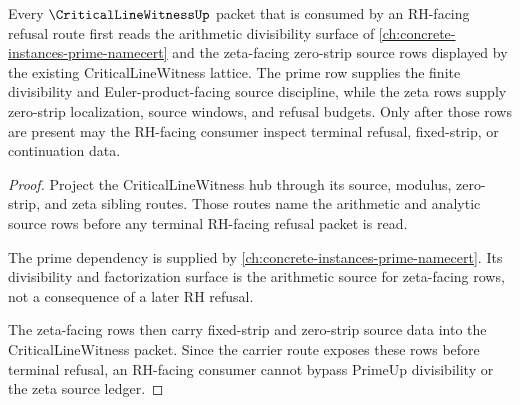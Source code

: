 \begin{proposition}
\label{prop:critical-line-witness-prime-zeta-dependency-route}
Every $\CriticalLineWitnessUp$ packet that is consumed by an RH-facing refusal route first reads the arithmetic divisibility surface of \autoref{ch:concrete-instances-prime-namecert} and the zeta-facing zero-strip source rows displayed by the existing CriticalLineWitness lattice. The prime row supplies the finite divisibility and Euler-product-facing source discipline, while the zeta rows supply zero-strip localization, source windows, and refusal budgets. Only after those rows are present may the RH-facing consumer inspect terminal refusal, fixed-strip, or continuation data.
\end{proposition}
\begin{proof}
Project the CriticalLineWitness hub through its source, modulus, zero-strip, and zeta sibling routes. Those routes name the arithmetic and analytic source rows before any terminal RH-facing refusal packet is read.

The prime dependency is supplied by \autoref{ch:concrete-instances-prime-namecert}. Its divisibility and factorization surface is the arithmetic source for zeta-facing rows, not a consequence of a later RH refusal.

The zeta-facing rows then carry fixed-strip and zero-strip source data into the CriticalLineWitness packet. Since the carrier route exposes these rows before terminal refusal, an RH-facing consumer cannot bypass PrimeUp divisibility or the zeta source ledger.
\end{proof}
